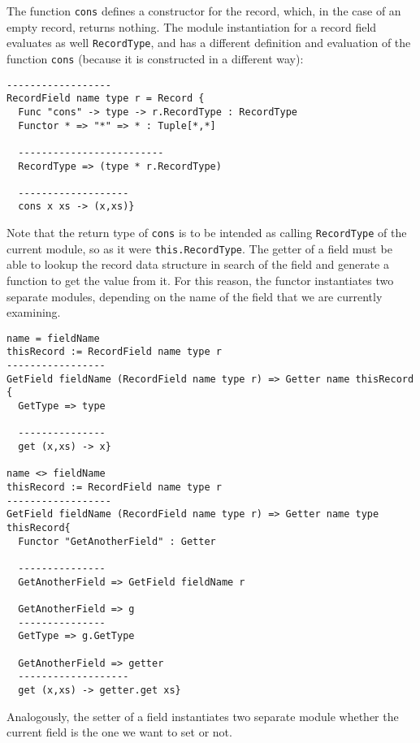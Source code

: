 \noindent
The function \texttt{cons} defines a constructor for the record, which, in the case of an empty record, returns nothing. The module instantiation for a record field evaluates as well \texttt{RecordType}, and has a different definition and evaluation of the function \texttt{cons} (because it is constructed in a different way):

\begin{lstlisting}
------------------
RecordField name type r = Record {
  Func "cons" -> type -> r.RecordType : RecordType
  Functor * => "*" => * : Tuple[*,*]
  
  -------------------------
  RecordType => (type * r.RecordType)
  
  -------------------
  cons x xs -> (x,xs)} 
\end{lstlisting}

\noindent
Note that the return type of \texttt{cons} is to be intended as calling \texttt{RecordType} of the current module, so as it were \texttt{this.RecordType}.
The getter of a field must be able to lookup the record data structure in search of the field and generate a function to get the value from it. For this reason, the functor instantiates two separate modules, depending on the name of the field that we are currently examining.

\begin{lstlisting}
name = fieldName
thisRecord := RecordField name type r
-----------------
GetField fieldName (RecordField name type r) => Getter name thisRecord {
  GetType => type
  
  ---------------
  get (x,xs) -> x}

name <> fieldName
thisRecord := RecordField name type r
------------------
GetField fieldName (RecordField name type r) => Getter name type thisRecord{
  Functor "GetAnotherField" : Getter
  
  ---------------
  GetAnotherField => GetField fieldName r
  
  GetAnotherField => g
  ---------------
  GetType => g.GetType
  
  GetAnotherField => getter
  -------------------
  get (x,xs) -> getter.get xs}
\end{lstlisting}

\noindent
Analogously, the setter of a field instantiates two separate module whether the current field is the one we want to set or not.

